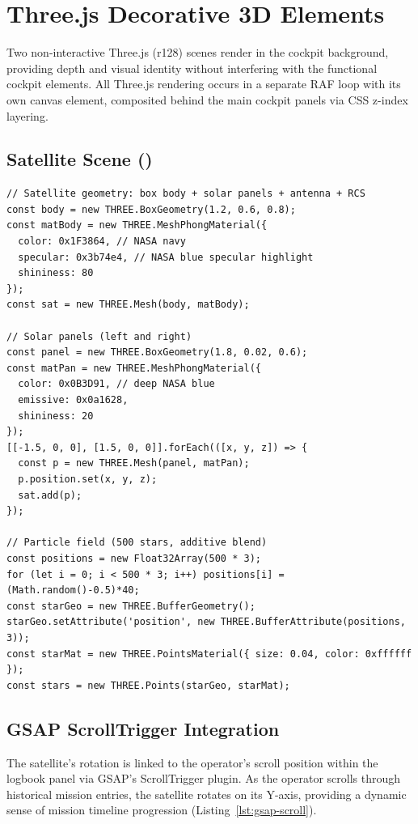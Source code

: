 \section{Three.js Decorative 3D Elements}

Two non-interactive Three.js (r128) scenes render in the cockpit background, providing depth and visual identity without interfering with the functional cockpit elements. All Three.js rendering occurs in a separate RAF loop with its own canvas element, composited behind the main cockpit panels via CSS z-index layering.

\subsection{Satellite Scene ()}

\begin{lstlisting}[caption={Decorative satellite 3D scene geometry}, label={lst:satellite-scene}]
// Satellite geometry: box body + solar panels + antenna + RCS
const body = new THREE.BoxGeometry(1.2, 0.6, 0.8);
const matBody = new THREE.MeshPhongMaterial({
  color: 0x1F3864, // NASA navy
  specular: 0x3b74e4, // NASA blue specular highlight
  shininess: 80
});
const sat = new THREE.Mesh(body, matBody);

// Solar panels (left and right)
const panel = new THREE.BoxGeometry(1.8, 0.02, 0.6);
const matPan = new THREE.MeshPhongMaterial({
  color: 0x0B3D91, // deep NASA blue
  emissive: 0x0a1628,
  shininess: 20
});
[[-1.5, 0, 0], [1.5, 0, 0]].forEach(([x, y, z]) => {
  const p = new THREE.Mesh(panel, matPan);
  p.position.set(x, y, z);
  sat.add(p);
});

// Particle field (500 stars, additive blend)
const positions = new Float32Array(500 * 3);
for (let i = 0; i < 500 * 3; i++) positions[i] = (Math.random()-0.5)*40;
const starGeo = new THREE.BufferGeometry();
starGeo.setAttribute('position', new THREE.BufferAttribute(positions, 3));
const starMat = new THREE.PointsMaterial({ size: 0.04, color: 0xffffff });
const stars = new THREE.Points(starGeo, starMat);
\end{lstlisting}

\subsection{GSAP ScrollTrigger Integration}

The satellite's rotation is linked to the operator's scroll position within the logbook panel via GSAP's ScrollTrigger plugin. As the operator scrolls through historical mission entries, the satellite rotates on its Y-axis, providing a dynamic sense of mission timeline progression (Listing~\ref{lst:gsap-scroll}).

